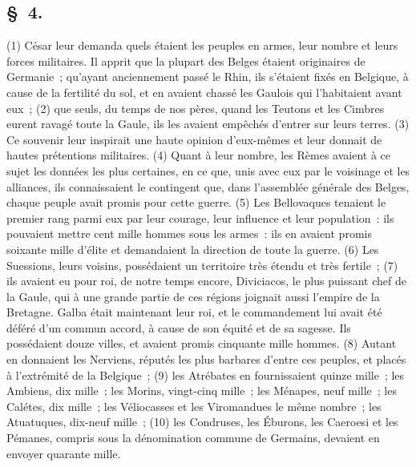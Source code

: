 \documentclass[french,twoside]{book} %
\begin{document}
\subsection[{§ 4.}]{ \textsc{§ 4.} }
\noindent (1) César leur demanda quels étaient les peuples en armes, leur nombre et leurs forces militaires. Il apprit que la plupart des Belges étaient originaires de Germanie ; qu’ayant anciennement passé le Rhin, ils s’étaient fixés en Belgique, à cause de la fertilité du sol, et en avaient chassé les Gaulois qui l’habitaient avant eux ; (2) que seuls, du temps de nos pères, quand les Teutons et les Cimbres eurent ravagé toute la Gaule, ils les avaient empêchés d’entrer sur leurs terres. (3) Ce souvenir leur inspirait une haute opinion d’eux-mêmes et leur donnait de hautes prétentions militaires. (4) Quant à leur nombre, les Rèmes avaient à ce sujet les données les plus certaines, en ce que, unis avec eux par le voisinage et les alliances, ils connaissaient le contingent que, dans l’assemblée générale des Belges, chaque peuple avait promis pour cette guerre. (5) Les Bellovaques tenaient le premier rang parmi eux par leur courage, leur influence et leur population : ils pouvaient mettre cent mille hommes sous les armes : ils en avaient promis soixante mille d’élite et demandaient la direction de toute la guerre. (6) Les Suessions, leurs voisins, possédaient un territoire très étendu et très fertile ; (7) ils avaient eu pour roi, de notre temps encore, Diviciacos, le plus puissant chef de la Gaule, qui à une grande partie de ces régions joignait aussi l’empire de la Bretagne. Galba était maintenant leur roi, et le commandement lui avait été déféré d’un commun accord, à cause de son équité et de sa sagesse. Ils possédaient douze villes, et avaient promis cinquante mille hommes. (8) Autant en donnaient les Nerviens, réputés les plus barbares d’entre ces peuples, et placés à l’extrémité de la Belgique ; (9) les Atrébates en fournissaient quinze mille ; les Ambiens, dix mille ; les Morins, vingt-cinq mille ; les Ménapes, neuf mille ; les Calétes, dix mille ; les Véliocasses et les Viromandues le même nombre ; les Atuatuques, dix-neuf mille ; (10) les Condruses, les Éburons, les Caeroesi et les Pémanes, compris sous la dénomination commune de Germains, devaient en envoyer quarante mille.
\end{document}
